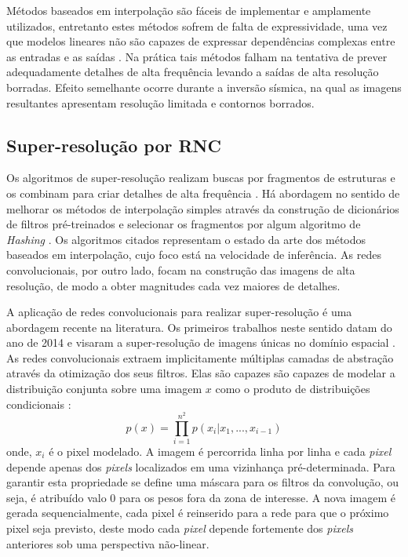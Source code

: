 Métodos baseados em interpolação são fáceis de implementar e amplamente utilizados,
entretanto estes métodos sofrem de falta de expressividade, uma vez que modelos lineares
não são capazes de expressar dependências complexas entre as entradas e as saídas \citep{HsiehAndrews1978}.
Na prática tais métodos falham na tentativa de prever adequadamente detalhes de alta frequência
levando a saídas de alta resolução borradas. Efeito semelhante ocorre durante a inversão sísmica,
na qual as imagens resultantes apresentam resolução limitada e contornos borrados.

\subsection{Super-resolução por RNC}

Os algoritmos de super-resolução realizam buscas por
fragmentos de estruturas e os combinam para criar detalhes
de alta frequência \citep{Freeman2002,Huang2015}. Há abordagem no sentido
de melhorar os métodos de interpolação simples através da construção
de dicionários de filtros pré-treinados e selecionar os fragmentos
por algum algoritmo de \textit{Hashing} \citep{Romano2017}. Os algoritmos citados
representam o estado da arte dos métodos baseados em interpolação, cujo foco está na
velocidade de inferência. As redes convolucionais, por outro lado,
focam na construção das imagens de alta resolução, de modo a obter magnitudes
cada vez maiores de detalhes.

A aplicação de redes convolucionais para realizar super-resolução é uma abordagem
recente na literatura. Os primeiros trabalhos neste sentido datam
do ano de 2014 e visaram a super-resolução de imagens únicas no
domínio espacial \cite{dong16}. As redes convolucionais extraem implicitamente
múltiplas camadas de abstração através da otimização dos seus filtros.
Elas são capazes são capazes de modelar a distribuição conjunta sobre
uma imagem $x$ como o produto de distribuições condicionais \citep{Oord16}:
\begin{equation}
\label{eqn:prodcnn}
p(x) = \prod_{i=1}^{n^2}p(x_i|x_1,...,x_{i-1})
\end{equation}
onde, $x_i$ é o pixel modelado. A imagem é percorrida linha por linha e cada
\textit{pixel} depende apenas dos \textit{pixels} localizados em uma vizinhança pré-determinada.
Para garantir esta propriedade se define uma máscara para os filtros da convolução,
ou seja, é atribuído valo $0$ para os pesos fora da zona de interesse.
A nova imagem é gerada sequencialmente, cada pixel é reinserido para a rede para que o próximo pixel seja previsto,
deste modo cada \textit{pixel} depende fortemente dos \textit{pixels} anteriores
sob uma perspectiva não-linear.

